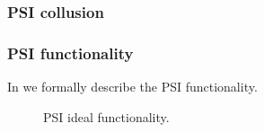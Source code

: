 \subsubsection{PSI collusion}
\subsubsection{PSI functionality}
\label{sec:psifunc}
In  we formally describe the PSI functionality.%

\begin{figure}[htb]\centering
{}
\caption{PSI ideal functionality.}
\label{fig:psifunc}
\end{figure} 

